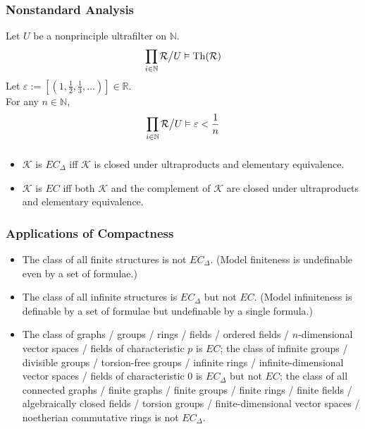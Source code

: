 \documentclass[UTF8,aspectratio=43,11pt,colorlinks,compress,openany]{beamer}%
\begin{document}
\begin{frame}\frametitle{Nonstandard Analysis}
Let $U$ be a nonprinciple ultrafilter on $\mathbb{N}$.
\[\prod\limits_{i\in\mathbb{N}}\mathcal{R}\big\slash U\vDash\operatorname{Th}(\mathcal{R})\]
Let $\varepsilon:=\left[(1,\frac{1}{2},\frac{1}{3},\dots)\right]\in\mathbb{R}$.\\
For any $n\in\mathbb{N}$,
\[\prod\limits_{i\in\mathbb{N}}\mathcal{R}\big\slash U\vDash\varepsilon<\frac{1}{n}\]
\end{frame}

\begin{frame}\frametitle{}
\begin{theorem}
\begin{itemize}
	\item $\mathcal{K}$ is $EC_\Delta$ iff $\mathcal{K}$ is closed under ultraproducts and elementary equivalence.
	\item $\mathcal{K}$ is $EC$ iff both $\mathcal{K}$ and the complement of $\mathcal{K}$ are closed under ultraproducts and elementary equivalence.
\end{itemize}
\end{theorem}
\end{frame}

\begin{frame}\frametitle{Applications of Compactness}
	\begin{itemize}
		\item The class of all finite structures is not $EC_\Delta$. (Model finiteness is undefinable even by a set of formulae.)
		\item The class of all infinite structures is $EC_\Delta$ but not $EC$. (Model infiniteness is definable by a set of formulae but undefinable by a single formula.)
		\item The class of graphs / groups / rings / fields / ordered fields / $n$-dimensional vector spaces / fields of characteristic $p$ is $EC$; the class of infinite groups / divisible groups / torsion-free groups / infinite rings / infinite-dimensional vector spaces / fields of characteristic $0$ is $EC_\Delta$ but not $EC$; the class of all connected graphs / finite graphs / finite groups / finite rings / finite fields / algebraically closed fields / torsion groups / finite-dimensional vector spaces / noetherian commutative rings is not $EC_\Delta$.
	\end{itemize}
\end{frame}
\end{document}
